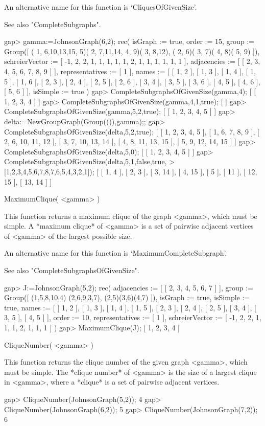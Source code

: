 An alternative name for this function is 
`CliquesOfGivenSize'.

See also "CompleteSubgraphs".

\beginexample
gap> gamma:=JohnsonGraph(6,2);                         
rec( isGraph := true, order := 15, 
  group := Group([ ( 1, 6,10,13,15, 5)( 2, 7,11,14, 4, 9)( 3, 8,12), 
      ( 2, 6)( 3, 7)( 4, 8)( 5, 9) ]), 
  schreierVector := [ -1, 2, 2, 1, 1, 1, 1, 1, 2, 1, 1, 1, 1, 1, 1 ], 
  adjacencies := [ [ 2, 3, 4, 5, 6, 7, 8, 9 ] ], representatives := [ 1 ], 
  names := [ [ 1, 2 ], [ 1, 3 ], [ 1, 4 ], [ 1, 5 ], [ 1, 6 ], [ 2, 3 ], 
      [ 2, 4 ], [ 2, 5 ], [ 2, 6 ], [ 3, 4 ], [ 3, 5 ], [ 3, 6 ], [ 4, 5 ], 
      [ 4, 6 ], [ 5, 6 ] ], isSimple := true )
gap> CompleteSubgraphsOfGivenSize(gamma,4);
[ [ 1, 2, 3, 4 ] ]
gap> CompleteSubgraphsOfGivenSize(gamma,4,1,true);
[  ]
gap> CompleteSubgraphsOfGivenSize(gamma,5,2,true);
[ [ 1, 2, 3, 4, 5 ] ]
gap> delta:=NewGroupGraph(Group(()),gamma);;
gap> CompleteSubgraphsOfGivenSize(delta,5,2,true);
[ [ 1, 2, 3, 4, 5 ], [ 1, 6, 7, 8, 9 ], [ 2, 6, 10, 11, 12 ], 
  [ 3, 7, 10, 13, 14 ], [ 4, 8, 11, 13, 15 ], [ 5, 9, 12, 14, 15 ] ]
gap> CompleteSubgraphsOfGivenSize(delta,5,0);
[ [ 1, 2, 3, 4, 5 ] ]
gap> CompleteSubgraphsOfGivenSize(delta,5,1,false,true,
>       [1,2,3,4,5,6,7,8,7,6,5,4,3,2,1]);
[ [ 1, 4 ], [ 2, 3 ], [ 3, 14 ], [ 4, 15 ], [ 5 ], [ 11 ], [ 12, 15 ], 
  [ 13, 14 ] ]
\endexample


\>MaximumClique( <gamma> )

This function returns a maximum clique of the graph <gamma>, which must
be simple.  A *maximum clique*
of <gamma> is a
set of pairwise adjacent vertices of <gamma> of the largest possible size.

An alternative name for this function is
`MaximumCompleteSubgraph'.

See also "CompleteSubgraphsOfGivenSize".

\beginexample
gap> J:=JohnsonGraph(5,2);
rec( adjacencies := [ [ 2, 3, 4, 5, 6, 7 ] ], group := Group([ (1,5,8,10,4)
  (2,6,9,3,7), (2,5)(3,6)(4,7) ]), isGraph := true, isSimple := true, 
  names := [ [ 1, 2 ], [ 1, 3 ], [ 1, 4 ], [ 1, 5 ], [ 2, 3 ], [ 2, 4 ], 
      [ 2, 5 ], [ 3, 4 ], [ 3, 5 ], [ 4, 5 ] ], order := 10, 
  representatives := [ 1 ], schreierVector := [ -1, 2, 2, 1, 1, 1, 2, 1, 1, 1 
     ] )
gap> MaximumClique(J);
[ 1, 2, 3, 4 ]
\endexample


\>CliqueNumber( <gamma> )

This function returns the clique number of the given graph <gamma>,
which must be simple.  The *clique number*
of <gamma> is the size of a largest clique in <gamma>, where a *clique*
is a set of pairwise adjacent vertices.

\beginexample
gap> CliqueNumber(JohnsonGraph(5,2));
4
gap> CliqueNumber(JohnsonGraph(6,2));
5
gap> CliqueNumber(JohnsonGraph(7,2));
6
\endexample
